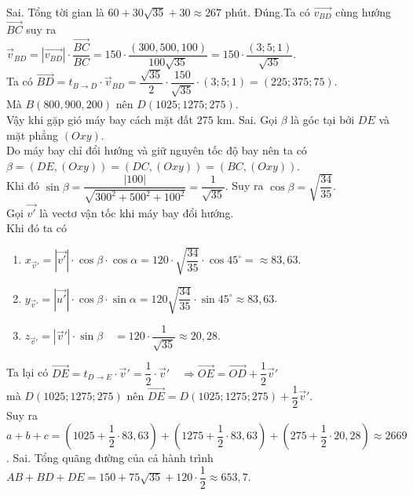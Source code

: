 \begin{ex}
{        \begin{itemchoice}
            \itemch Sai. Tổng tời gian là $60+30\sqrt{35}+30\approx 267$ phút.
            \itemch Đúng.Ta có $\overrightarrow{v_{BD}}$ cùng hướng $\overrightarrow{B C}$ suy ra \\ $\overrightarrow{v}_{BD}=\left|\overrightarrow{v_{B D}}\right| \cdot \dfrac{\overrightarrow{BC}}{BC}=150\cdot \dfrac{(300, 500, 100)}{100\sqrt{35}}=150\cdot \dfrac{(3 ; 5 ; 1)}{\sqrt{35}}$.\\
            Ta có $\overrightarrow{B D}=t_{B \rightarrow D} \cdot \vec{v}_{B D}=\dfrac{\sqrt{35}}{2} \cdot \dfrac{150}{\sqrt{35}} \cdot(3 ; 5 ; 1)=(225 ; 375 ; 75)$.\\
            Mà  $B(800, 900, 200)$ nên $D(1025 ; 1275 ; 275)$.\\
            Vậy khi gặp gió máy bay cách mặt đất $275$ km.
            \itemch Sai. Gọi $\beta$ là góc tại bởi  $DE$ và mặt phẳng $(Oxy)$. \\
            Do máy bay chỉ đổi hướng và giữ nguyên tốc độ bay nên ta có \\
            $\beta=(DE,(Oxy))=(DC,(Oxy))=(BC,(Oxy))$.\\
            Khi đó $\sin \beta=\dfrac{|100|}{\sqrt{300^2+500^2+100^2}}=\dfrac{1}{\sqrt{35}}$. Suy ra $\cos \beta=\sqrt{\dfrac{34}{35}}$.\\
            Gọi $\overrightarrow{v'} $ là vectơ vận tốc khi máy bay đổi hướng.\\
            Khi đó ta có
            \begin{enumerate}[•]
                \item	$x_{\vec{v}'}=\left|\vec{v'}\right| \cdot \cos \beta \cdot \cos \alpha=120 \cdot \sqrt{\dfrac{34}{35}} \cdot \cos 45^{\circ}=\approx 83{,}63$.				
                \item 		$y_{\vec{v}'}=\left|\overrightarrow{u'}\right| \cdot \cos \beta \cdot \sin \alpha=120 \sqrt{\dfrac{34}{35}} \cdot \sin 45^{\circ} \approx 83{,}63$.						
                \item $z_{\overrightarrow{v}'}=\left|\vec{v}'\right| \cdot \sin \beta \quad=120 \cdot \dfrac{1}{\sqrt{35}} \approx 20{,}28$.
            \end{enumerate}	
            Ta lại có 	$\overrightarrow{DE}=t_{D \rightarrow E} \cdot \vec{v}'=\dfrac{1}{2} \cdot \overrightarrow{v}' \quad \Rightarrow \overrightarrow{OE}=\overrightarrow{OD}+\dfrac{1}{2} \overrightarrow{v}'$\\ mà  $D(1025 ; 1275 ; 275)$ nên 
            $\overrightarrow{DE}=D(1025 ; 1275 ; 275)+\dfrac{1}{2}\overrightarrow{v}'$.\\
            Suy ra $a+b+c=\left(1025+\dfrac{1}{2} \cdot 83{,}63\right)+\left(1275+\dfrac{1}{2} \cdot 83{,}63\right)+\left(275+\dfrac{1}{2} \cdot 20{,}28\right)\approx 2669$.
            \itemch Sai. Tổng quãng đường của cả hành trình\\
            $A B+B D+D E=150+75\sqrt{35}+120\cdot \dfrac{1}{2}\approx 653{,}7$.
        \end{itemchoice}		
    }
\end{ex}
